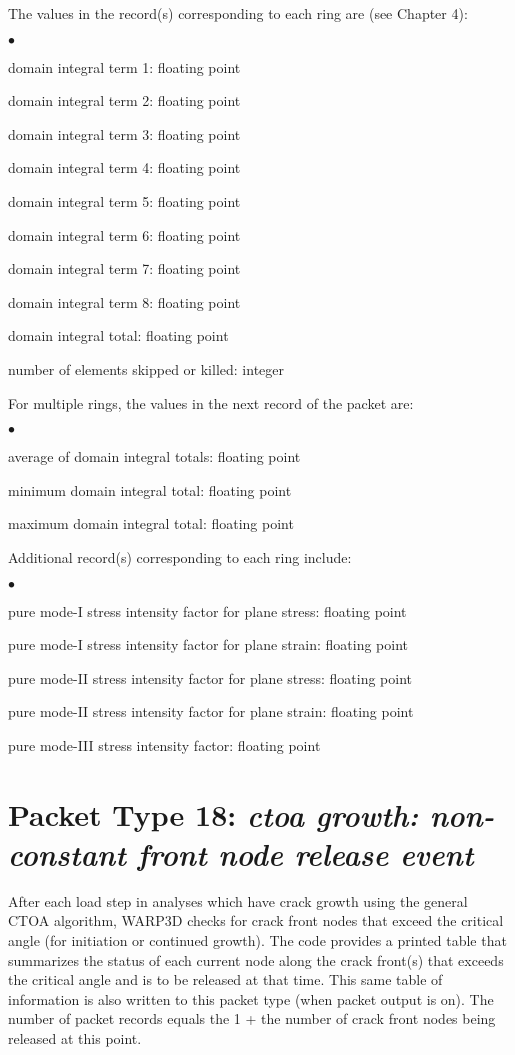 \documentclass[10pt]{report}
\numberwithin{equation}{section}
\newcommand{\ti}{\emph}
\newcommand{\squishlist}{
 \begin{list}{$\bullet$}
  { \setlength{\itemsep}{0pt}
     \setlength{\parsep}{3pt}
     \setlength{\topsep}{3pt}
     \setlength{\partopsep}{0pt}
     \setlength{\leftmargin}{1.5em}
     \setlength{\labelwidth}{1em}
     \setlength{\labelsep}{0.5em} } }
\newcommand{\squishend}{
  \end{list}  }
\begin{document}
\noindent The values in the record(s) corresponding to each ring are (see Chapter 4):   
\squishlist
\item domain integral term 1: floating point
\item domain integral term 2: floating point
\item domain integral term 3: floating point
\item domain integral term 4: floating point
\item domain integral term 5: floating point
\item domain integral term 6: floating point
\item domain integral term 7: floating point
\item domain integral term 8: floating point
\item domain integral total: floating point
\item number of elements skipped or killed: integer
\squishend
\noindent For multiple rings, the values in the next record of the packet are:   
\squishlist
\item average of domain integral totals: floating point
\item minimum domain integral total: floating point
\item maximum domain integral total: floating point
\squishend
\noindent Additional record(s) corresponding to each ring include:  
\squishlist
\item pure mode-I stress intensity factor for plane stress: floating point
\item pure mode-I stress intensity factor for plane strain: floating point
\item pure mode-II stress intensity factor for plane stress: floating point
\item pure mode-II stress intensity factor for plane strain: floating point
\item pure mode-III stress intensity factor: floating point
\squishend

%
%
\section{Packet Type 18: \ti{ctoa growth: non-constant front node release event}}
After each load step in analyses which have crack growth using the 
general CTOA algorithm, WARP3D checks for crack front nodes that 
exceed the critical angle (for initiation or continued growth). The code provides 
a printed table that summarizes the status of each current node along the 
crack front(s) that exceeds the critical angle and is to be 
released at that time. This same table of information is also written 
to this packet type (when packet output is on). The number of packet 
records equals the 1 + the number of crack front nodes being released at this point.
\end{document}
